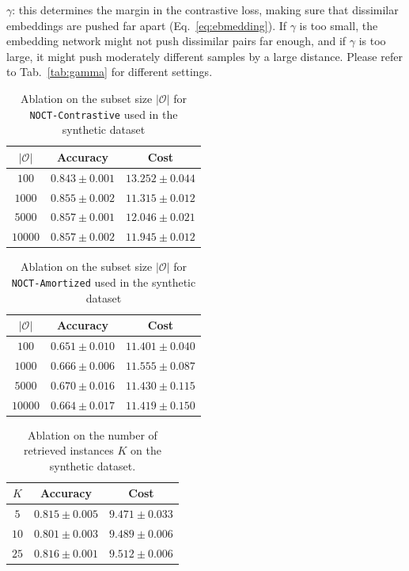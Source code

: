 $\gamma$: this determines the margin in the contrastive loss, making sure that dissimilar embeddings are pushed far apart (Eq.~\ref{eq:ebmedding}). If $\gamma$ is too small, the embedding network might not push dissimilar pairs far enough, and if $\gamma$ is too large, it might push moderately different samples by a large distance. Please refer to Tab.~\ref{tab:gamma} for different settings.%

\smallskip
\begin{table}[H]
\centering
\caption{Ablation on the subset size $|\mathcal{O}|$ for \texttt{NOCT-Contrastive} used in the synthetic dataset}
\label{tab:subset_size_np}
\begin{tabular}{ccc}
\toprule
$|\mathcal{O}|$ & Accuracy & Cost \\
\midrule
$100$    & $0.843 \pm 0.001$ & $13.252 \pm 0.044$ \\
$1000$  & $0.855\pm0.002$ & $11.315\pm0.012$  \\ 
$5000$  & $0.857 \pm 0.001$ & $12.046 \pm 0.021$ \\
$10000$ & $0.857 \pm 0.002$ & $11.945 \pm 0.012$ \\
\bottomrule
\end{tabular}
\end{table}
\smallskip

\begin{table}[H]
    \centering
    \caption{Ablation on the subset size $|\mathcal{O}|$ for \texttt{NOCT-Amortized} used in the synthetic dataset}
    \label{tab:subset_size_p}
    \begin{tabular}{ccc}
        \toprule
        $|\mathcal{O}|$ & Accuracy & Cost \\
        \midrule
        $100$   & $0.651 \pm 0.010$ & $11.401 \pm 0.040$ \\
        $1000$  & $0.666\pm0.006$ & $11.555\pm0.087$ \\
        $5000$  & $0.670 \pm 0.016$ & $11.430 \pm 0.115$ \\
        $10000$ & $0.664 \pm 0.017$ & $11.419 \pm 0.150$ \\
        \bottomrule
    \end{tabular}
\end{table}

\smallskip


\begin{table}[H]
    \centering
    \caption{Ablation on the number of retrieved instances $K$ on the synthetic dataset.}
    \label{tab:neighbors}
    \begin{tabular}{ccc}
        \toprule
        $K$ & Accuracy & Cost \\
        \midrule
        $5$& $0.815\pm0.005$ & $9.471\pm0.033$ \\
        $10$ & $0.801 \pm 0.003$ & $9.489 \pm 0.006$ \\
        $25$ & $0.816 \pm 0.001$ & $9.512 \pm 0.006$ \\
        \bottomrule
    \end{tabular}
\end{table}

